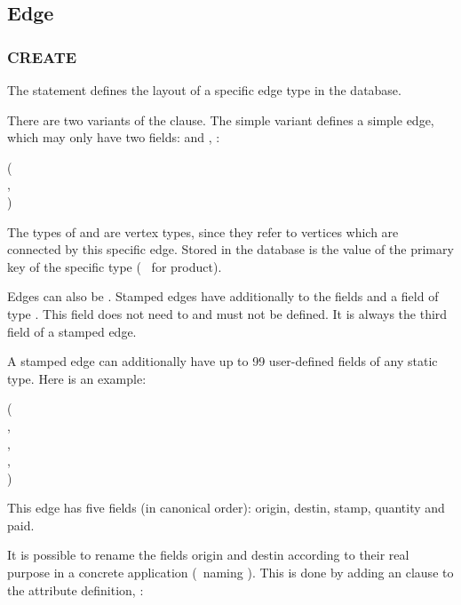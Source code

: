 \subsection{Edge}
\subsubsection{CREATE}
The  statement defines the layout
of a specific edge type in the database.

There are two variants of the  clause.
The simple variant defines a simple edge, which may only
have two fields:  and , \eg:

  ( \\
\hspace*{1cm} , \\
\hspace*{1cm} )

The types of  and 
are vertex types, since they refer
to vertices which are connected by this specific edge.
Stored in the database is the value of the primary key
of the specific type (\eg\  for product).

Edges can also be .
Stamped edges have additionally to the fields
 and 
a field  of type .
This field does not need to and must not be defined.
It is always the third field of a stamped edge.

A stamped edge can additionally have up to 99
user-defined fields of any static type.
Here is an example:

  ( \\
\hspace*{1cm}  , \\
\hspace*{1cm}  , \\
\hspace*{1cm}  , \\
\hspace*{1cm}  )

This edge has five fields (in canonical order):
origin, destin, stamp, quantity and paid. 

It is possible to rename the fields origin and destin
according to their real purpose in a concrete
application (\eg\ naming  ).
This is done by adding an  clause
to the attribute definition, \eg:

